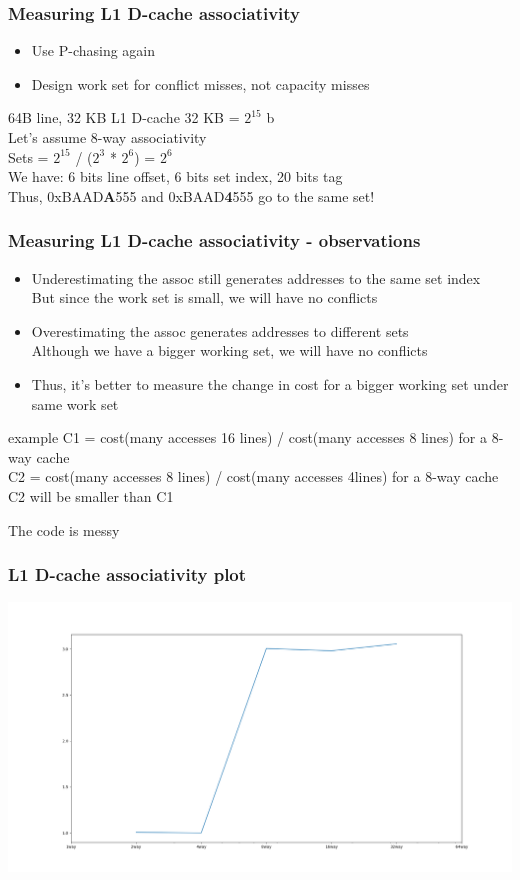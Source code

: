 \documentclass{beamer}
\begin{document}
\begin{frame}
\frametitle{Measuring L1 D-cache associativity}
\begin{itemize}
\item Use P-chasing again
\item Design work set for conflict misses, not capacity misses
\end{itemize}

\begin{block}{64B line, 32 KB L1 D-cache}
32 KB = $2^{15}$ b\\
Let's assume 8-way associativity\\
Sets = $2^{15}$ / ($2^{3}$ * $2^6$) = $2^6$\\
We have: 6 bits line offset, 6 bits set index, 20 bits tag\\
Thus, 0xBAAD\textbf{A}555 and 0xBAAD\textbf{4}555 go to the same set!
\end{block}
\end{frame}

\begin{frame}
\frametitle{Measuring L1 D-cache associativity - observations}
\begin{itemize}
\item Underestimating the assoc still generates addresses to the same set index\\
But since the work set is small, we will have no conflicts
\item Overestimating the assoc generates addresses to different sets\\
Although we have a bigger working set, we will have no conflicts
\item Thus, it's better to measure the change in cost for a bigger working set under same work set\\
\end{itemize}
\begin{block}{example}
C1 = cost(many accesses 16 lines) / cost(many accesses 8 lines) for a 8-way cache\\
C2 = cost(many accesses 8 lines) / cost(many accesses 4lines) for a 8-way cache\\
C2 will be smaller than C1
\end{block}
The code is messy
\end{frame}

\begin{frame}
\frametitle{L1 D-cache associativity plot}
\includegraphics[scale=.25]{img/l1_d_assoc.png}
\end{frame}
\end{document}
